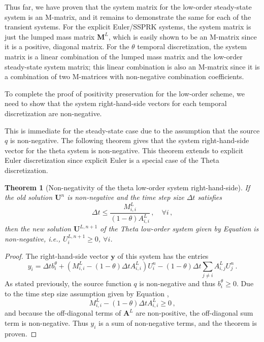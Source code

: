 \documentclass[xchauthor,chkrefs,fixeqskip,GCNS,amsmath,amsthm]{yjcphg}
\newtheorem{thm}{Theorem}
\theoremstyle{remark}
\begin{document}
Thus far, we have proven that the system matrix for the low-order
steady-state system is an M-matrix, and it remains to demonstrate the
same for each of the transient systems. For the explicit Euler/SSPRK
systems, the system matrix is just the lumped mass matrix $\mathbf{M}
^{L}$, which is easily shown to be an M-matrix since it is a positive,
diagonal matrix. For the $\theta$ temporal discretization, the system
matrix is a linear combination of the lumped mass matrix and the
low-order steady-state system matrix; this linear combination is also
an M-matrix since it is a combination of two M-matrices with
non-negative combination coefficients.

To complete the proof of positivity preservation for the low-order
scheme, we need to show that the system right-hand-side vectors for each
temporal discretization are non-negative.

This is immediate for the steady-state case due to the assumption that
the source $q$ is non-negative. The following theorem gives that the
system right-hand-side vector for the theta system is non-negative. This
theorem extends to explicit Euler discretization since explicit Euler
is a special case of the Theta discretization.

\begin{thm}[Non-negativity of the theta low-order system right-hand-side] If the
old solution $\mathbf{U}^{n}$ is non-negative and the time step size
$\Delta t$ satisfies
%
\begin{equation}
\label{eq:theta_cfl}
\Delta t\leq\frac{M^{L}_{i,i}}{(1-\theta)A_{i,i}^{L}}
\,,\quad
\forall i \,,
\end{equation}
%
then the new solution $\mathbf{U}^{L,n+1}$ of the Theta low-order system
given by Equation  is non-negative, i.e.,
$U^{L,n+1}_{i} \geq0$, $\forall i$.
\end{thm}

\begin{proof}
The right-hand-side vector $\mathbf{y}$ of this system has the entries
%
\begin{equation*}
y_{i} = \Delta tb^{\theta}_{i} + \left( M^{L}_{i,i} - (1-\theta)
\Delta tA^{L}_{i,i}\right) U^{n}_{i}
- (1-\theta)\Delta t\sum
\limits_{j\ne i}A^{L}_{i,j} U^{n}_{j}
\,.
\end{equation*}
%
As stated previously, the source function $q$ is non-negative and thus
$b^{\theta}_{i} \ge0 $. Due to the time step size assumption given by
Equation ,
%
\begin{equation*}
M^{L}_{i,i} - (1-\theta)\Delta tA^{L}_{i,i} \geq0 \,,
\end{equation*}
%
and because the off-diagonal terms of $\mathbf{A}^{L}$ are non-positive,
the off-diagonal sum term is non-negative. Thus $y_{i}$ is a sum of
non-negative terms, and the theorem is proven.
\end{proof}
\end{document}
